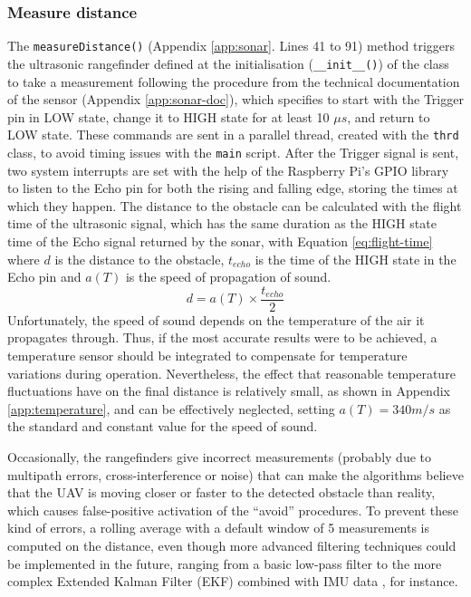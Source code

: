 \subsubsection{Measure distance} \label{sec:measureDistance}

The \texttt{measureDistance()} (Appendix \ref{app:sonar}. Lines 41 to 91) method triggers the ultrasonic rangefinder defined at the initialisation (\texttt{\_\_init\_\_()}) of the class to take a measurement following the procedure from the technical documentation of the sensor (Appendix \ref{app:sonar-doc}), which specifies to start with the Trigger pin in LOW state, change it to HIGH state for at least 10 $\mu s$, and return to LOW state.
These commands are sent in a parallel thread, created with the \texttt{thrd} class, to avoid timing issues with the \texttt{main} script.
After the Trigger signal is sent, two system interrupts are set with the help of the Raspberry Pi's GPIO library to listen to the Echo pin for both the rising and falling edge, storing the times at which they happen.
The distance to the obstacle can be calculated with the flight time of the ultrasonic signal, which has the same duration as the HIGH state time of the Echo signal returned by the sonar, with Equation \eqref{eq:flight-time} where $d$ is the distance to the obstacle, $t_{echo}$ is the time of the HIGH state in the Echo pin and $a(T)$ is the speed of propagation of sound.
\begin{equation}
	d=a(T)\times \frac{t_{echo}}{2}
	\label{eq:flight-time}
\end{equation}
Unfortunately, the speed of sound depends on the temperature of the air it propagates through.
Thus, if the most accurate results were to be achieved, a temperature sensor should be integrated to compensate for temperature variations during operation.
Nevertheless, the effect that reasonable temperature fluctuations have on the final distance is relatively small, as shown in Appendix \ref{app:temperature}, and can be effectively neglected, setting $a(T)=340 m/s$ as the standard and constant value for the speed of sound.

Occasionally, the rangefinders give incorrect measurements (probably due to multipath errors, cross-interference or noise) that can make the algorithms believe that the UAV is moving closer or faster to the detected obstacle than reality, which causes false-positive activation of the ``avoid'' procedures.
To prevent these kind of errors, a rolling average with a default window of 5 measurements is computed on the distance, even though more advanced filtering techniques could be implemented in the future, ranging from a basic low-pass filter to the more complex Extended Kalman Filter (EKF) combined with IMU data \cite{sasiadek2000}, for instance. 

